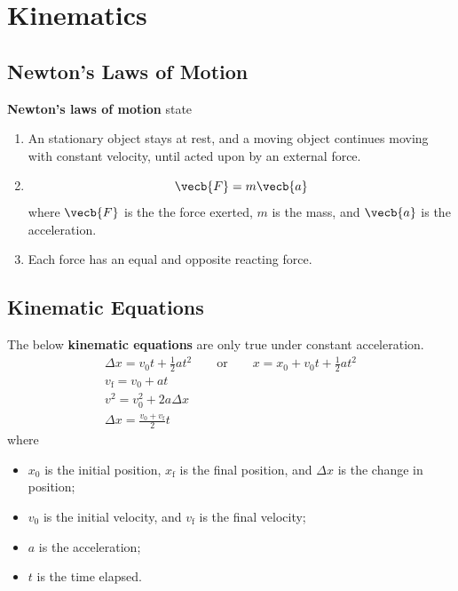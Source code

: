 \chapter{Kinematics}


\section{Newton's Laws of Motion}

\textbf{Newton's laws of motion} state
\begin{enumerate}
    \item \label{itm:newtons-1st-law}
        An stationary object stays at rest,
        and a moving object continues moving with constant velocity,
        until acted upon by an external force.
    \item
        \begin{equation} \label{eq:newtons-2nd-law}
            \vecb{F} = m\vecb{a}
        \end{equation}
        where \(\vecb{F}\) is the the force exerted, \(m\) is the mass,
        and \(\vecb{a}\) is the acceleration.
    \item \label{itm:newtons-3rd-law}
        Each force has an equal and opposite reacting force.
\end{enumerate}

\section{Kinematic Equations}

The below \textbf{kinematic equations} are only true under constant
acceleration.
\begin{subequations}
    \begin{gather} \label{eq:linear-kinematic}
        {
            \Delta{x} = v_0 t + \frac{1}{2} a t^2
            \qquad \mathrm{or} \qquad
            x = x_0 + v_0 t + \frac{1}{2} a t^2
        } \\
        v_\mathrm{f} = v_0 + a t \\
        v^2 = v_0^2 + 2 a \Delta{x} \\
        \Delta{x} = \frac{v_0 + v_\mathrm{f}}{2} t
    \end{gather}
\end{subequations}
where
\begin{itemize}
    \item \(x_0\) is the initial position,
        \(x_\mathrm{f}\) is the final position,
        and \(\Delta{x}\) is the change in position;
    \item \(v_0\) is the initial velocity,
        and \(v_\mathrm{f}\) is the final velocity;
    \item \(a\) is the acceleration;
    \item \(t\) is the time elapsed.
\end{itemize}
